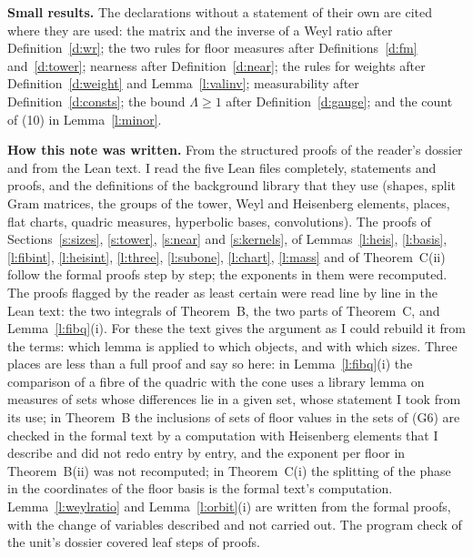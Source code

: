 \documentclass[11pt,a4paper]{article}
\newcommand{\subhead}[1]{\par\addvspace{9pt plus 2pt}\Needspace{4\baselineskip}\noindent\textbf{#1}\enspace\ignorespaces}
\theoremstyle{plainx}
\theoremstyle{uprightx}
\begin{document}
\textbf{Small results.} The declarations without a statement of their own are cited where they are used: the
matrix and the inverse of a Weyl ratio after Definition~\ref{d:wr}; the two rules for floor measures after
Definitions~\ref{d:fm} and~\ref{d:tower}; nearness after Definition~\ref{d:near}; the rules for weights after
Definition~\ref{d:weight} and Lemma~\ref{l:valinv}; measurability after Definition~\ref{d:consts}; the bound
$\Lambda\ge1$ after Definition~\ref{d:gauge}; and the count of (10) in Lemma~\ref{l:minor}.

\subhead{How this note was written.} From the structured proofs of the reader's dossier and from the Lean text. I
read the five Lean files completely, statements and proofs, and the definitions of the background library that they
use (shapes, split Gram matrices, the groups of the tower, Weyl and Heisenberg elements, places, flat charts,
quadric measures, hyperbolic bases, convolutions). The proofs of Sections~\ref{s:sizes}, \ref{s:tower},
\ref{s:near} and \ref{s:kernels}, of Lemmas~\ref{l:heis}, \ref{l:basis}, \ref{l:fibint}, \ref{l:heisint},
\ref{l:three}, \ref{l:subone}, \ref{l:chart}, \ref{l:mass} and of Theorem~C(ii) follow the formal proofs step by
step; the exponents in them were recomputed. The proofs flagged by the reader as least certain were read line by
line in the Lean text: the two integrals of Theorem~B, the two parts of Theorem~C, and Lemma~\ref{l:fibq}(i). For
these the text gives the argument as I could rebuild it from the terms: which lemma is applied to which objects,
and with which sizes. Three places are less than a full proof and say so here: in Lemma~\ref{l:fibq}(i) the
comparison of a fibre of the quadric with the cone uses a library lemma on measures of sets whose differences lie
in a given set, whose statement I took from its use; in Theorem~B the inclusions of sets of floor values in the
sets of (G6) are checked in the formal text by a computation with Heisenberg elements that I describe and did not
redo entry by entry, and the exponent per floor in Theorem~B(ii) was not recomputed; in Theorem~C(i) the splitting
of the phase in the coordinates of the floor basis is the formal text's computation. Lemma~\ref{l:weylratio} and
Lemma~\ref{l:orbit}(i) are written from the formal proofs, with the change of variables described and not carried
out. The program check of the unit's dossier covered \UnitSteps{} leaf steps of \UnitProofs{} proofs.
\end{document}
